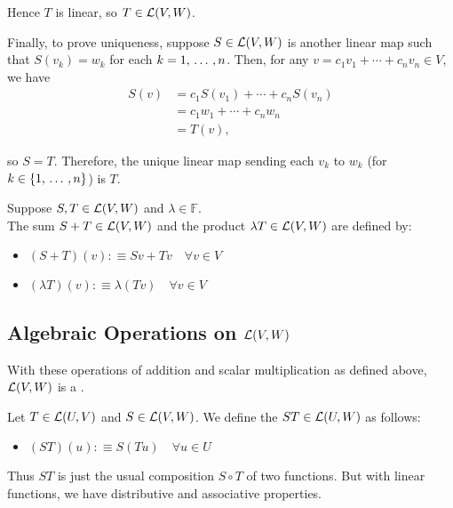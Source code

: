 \begin{prf}
  Hence $T$ is linear, so $T \in \mathcal{L}(V,W)$.

  Finally, to prove uniqueness, suppose \( S \in \mathcal{L}(V, W) \) is another linear map such that \( S(v_k) = w_k \) for each $k=1, {\, \ldots \,\,}, n$. Then, for any \( v = c_1 v_1 + \cdots + c_n v_n \in V \), we have
  \begin{align}
    S(v) &= c_1 S(v_1) + \cdots + c_n S(v_n) \\
         &= c_1 w_1 + \cdots + c_n w_n \\
         &= T(v),
  \end{align}

  so \( S = T \). Therefore, the unique linear map sending each $v_k$ to $w_k$ (for $k \in \{1, {\, \ldots \,\,}, n \}$) is $T$.
\end{prf}

\setcounter{thm}{4}
\begin{mydef} 
  Suppose $S, T \in {\mathcal{L}(V,W)}$ and $\lambda \in \mathbb{F}.$ \\
  The sum $S+T \in \mathcal{L} (V,W)$ and the product $\lambda T \in \mathcal{L} (V,W)$ are defined by:
  \begin{itemize}
    \item $(S+T)(v) :\equiv Sv+Tv \quad \forall v \in V$
    \item $(\lambda T)(v) : \equiv \lambda (Tv) \quad \forall v \in V$
  \end{itemize}
\end{mydef}

\subsection{Algebraic Operations on \texorpdfstring{$\mathcal{L}(V,W)$}{L(V,W)}}
\setcounter{thm}{5}
\begin{thm} [$\lvw$]
  With these operations of addition and scalar multiplication as defined above, $\lvw$ is a \vs.
\end{thm}

\setcounter{thm}{6}
\begin{mydef}
  Let $T \in {\mathcal{L}(U, V)}$ and $S \in {\mathcal{L}(V, W)}$. We define the  $ST \in {\mathcal{L}(U, W)}$ as follows:
  \begin{itemize}
    \item[] $(ST)(u) :\equiv S(Tu) \quad \forall u \in U$
  \end{itemize}
  Thus $ST$ is just the usual composition  $S \circ T$ of two functions. But with linear functions, we have distributive and associative properties.
\end{mydef}

